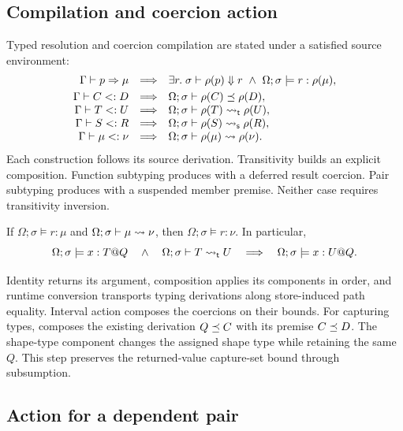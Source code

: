 \documentclass[acmsmall,screen,nonacm]{acmart}
\begin{document}
\subsection{Compilation and coercion action}

Typed resolution and coercion compilation are stated under a satisfied
source environment:
\[
\begin{array}{rcl}
\Gamma\vdash p\Rightarrow\mu
 &\Longrightarrow&
 \exists r.\;\sigma\vdash\rho(p)\Downarrow r
       \ \land\ \Omega;\sigma\models r:\rho(\mu),
\\[3pt]
\Gamma\vdash C<:D
 &\Longrightarrow&
 \Omega;\sigma\vdash\rho(C)\mathrel{\preceq}\rho(D),
\\
\Gamma\vdash T<:U
 &\Longrightarrow&
 \Omega;\sigma\vdash\rho(T)\mathrel{\rightsquigarrow_{\mathsf t}}\rho(U),
\\
\Gamma\vdash S<:R
 &\Longrightarrow&
 \Omega;\sigma\vdash\rho(S)\mathrel{\rightsquigarrow_{\mathsf s}}\rho(R),
\\
\Gamma\vdash\mu<:\nu
 &\Longrightarrow&
 \Omega;\sigma\vdash\rho(\mu)\mathrel{\rightsquigarrow}\rho(\nu).
\end{array}
\]
Each construction follows its source derivation. Transitivity builds an
explicit composition.  Function subtyping produces  with a
deferred result coercion. Pair subtyping produces  with a
suspended member premise. Neither case requires transitivity inversion.

\begin{lemma}
\label{lem:coercion-action}
If \(\Omega;\sigma\models r:\mu\) and
\(\Omega;\sigma\vdash\mu\mathrel{\rightsquigarrow}\nu\), then
\(\Omega;\sigma\models r:\nu\).  In particular,
\[
 \Omega;\sigma\models x:T@Q
 \quad\land\quad
 \Omega;\sigma\vdash T\mathrel{\rightsquigarrow_{\mathsf t}} U
 \quad\Longrightarrow\quad
 \Omega;\sigma\models x:U@Q.
\]
\end{lemma}

Identity returns its argument, composition applies its components in order,
and runtime conversion transports typing derivations along store-induced path
equality. Interval action composes the coercions on their bounds. For
capturing types,  composes the existing derivation
\(Q\mathrel{\preceq} C\) with its premise \(C\mathrel{\preceq} D\). The shape-type component
changes the assigned shape type while retaining the same \(Q\). This step preserves the
returned-value capture-set bound through subsumption.

\subsection{Action for a dependent pair}
\label{sec:pair-action}
\end{document}
